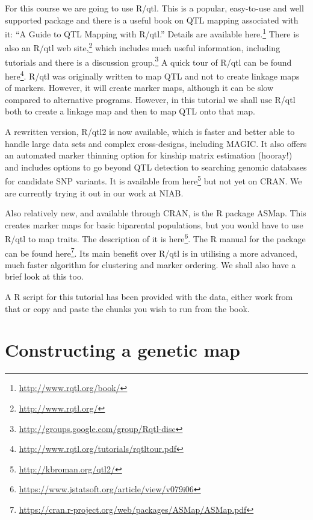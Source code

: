 \documentclass[
]{book}
\makeatletter
\renewcommand{\href}[2]{#2\footnote{\url{#1}}}
\newenvironment{kframe}{%
\medskip{}
\setlength{\fboxsep}{.8em}
 \def\at@end@of@kframe{}%
 \ifinner\ifhmode%
  \def\at@end@of@kframe{\end{minipage}}%
  \begin{minipage}{\columnwidth}%
 \fi\fi%
 \def\FrameCommand##1{\hskip\@totalleftmargin \hskip-\fboxsep
 \colorbox{shadecolor}{##1}\hskip-\fboxsep
     \hskip-\linewidth \hskip-\@totalleftmargin \hskip\columnwidth}%
 \MakeFramed {\advance\hsize-\width
   \@totalleftmargin\z@ \linewidth\hsize
   \@setminipage}}%
 {\par\unskip\endMakeFramed%
 \at@end@of@kframe}
\newenvironment{rmdblock}[1]
  {
  \begin{itemize}
  \renewcommand{\labelitemi}{
    \raisebox{-.7\height}[0pt][0pt]{
      {\setkeys{Gin}{width=3em,keepaspectratio}\texttt{[image: images/\#1]}}
    }
  }
  \setlength{\fboxsep}{1em}
  \begin{kframe}
  \item
  }
  {
  \end{kframe}
  \end{itemize}
  }
\newenvironment{rmdnote}
  {\begin{rmdblock}{note}}
  {\end{rmdblock}}
\makeatother
\begin{document}
For this course we are going to use R/qtl. This is a popular, easy-to-use and well supported package and there is a useful book on QTL mapping associated with it: ``A
Guide to QTL Mapping with R/qtl.'' Details are available \href{http://www.rqtl.org/book/}{here.} There is also an R/qtl \href{http://www.rqtl.org/}{web site,} which
includes much useful information, including tutorials and there is a \href{http://groups.google.com/group/Rqtl-disc}{discussion group.} A quick tour of R/qtl can be found \href{http://www.rqtl.org/tutorials/rqtltour.pdf}{here}. R/qtl was originally written to map QTL and not to create linkage maps of markers. However, it will create marker maps, although it can be slow compared to alternative programs. However, in this tutorial we shall use R/qtl both to create a linkage map and then to map QTL onto that map.

A rewritten version, R/qtl2 is now available, which is faster and better able to handle
large data sets and complex cross-designs, including MAGIC. It also offers an automated
marker thinning option for kinship matrix estimation (hooray!) and includes options to
go beyond QTL detection to searching genomic databases for candidate SNP variants. It
is available from \href{http://kbroman.org/qtl2/}{here} but not yet on CRAN. We are currently trying it out in our work at NIAB.

Also relatively new, and available through CRAN, is the R package ASMap. This creates marker maps for basic biparental populations, but you would have to use R/qtl to map traits. The description of it is \href{https://www.jstatsoft.org/article/view/v079i06}{here}. The R manual for the package can be found \href{https://cran.r-project.org/web/packages/ASMap/ASMap.pdf}{here}. Its main benefit over R/qtl is in utilising a more advanced, much faster algorithm for clustering and marker ordering. We shall also have a brief look at this too.

\begin{rmdnote}
A R script for this tutorial has been provided with the data, either work from that or copy and paste the chunks you wish to run from the book.
\end{rmdnote}

\hypertarget{constructing-a-genetic-map}{%
\section{Constructing a genetic map}\label{constructing-a-genetic-map}}
\end{document}
